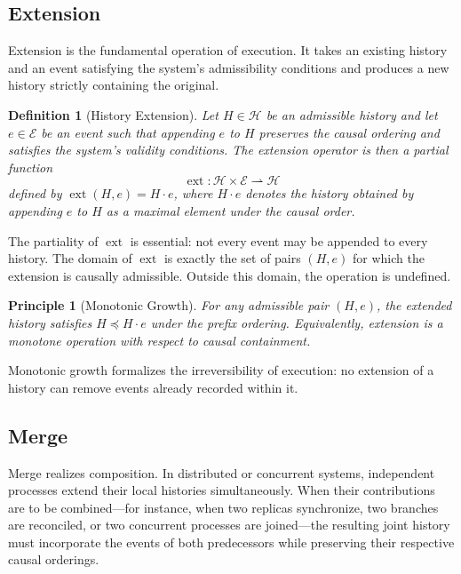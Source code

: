 \documentclass[12pt]{article}
\newtheorem{definition}{Definition}
\newtheorem{principle}{Principle}
\begin{document}
\subsection{Extension}

Extension is the fundamental operation of execution. It takes an existing history and an event satisfying the system's admissibility conditions and produces a new history strictly containing the original.

\begin{definition}[History Extension]
Let $H \in \mathcal{H}$ be an admissible history and let $e \in \mathcal{E}$ be an event such that appending $e$ to $H$ preserves the causal ordering and satisfies the system's validity conditions. The \emph{extension operator} is then a partial function
\[
\operatorname{ext} : \mathcal{H} \times \mathcal{E} \rightharpoonup \mathcal{H}
\]
defined by $\operatorname{ext}(H, e) = H \cdot e$, where $H \cdot e$ denotes the history obtained by appending $e$ to $H$ as a maximal element under the causal order.
\end{definition}

The partiality of $\operatorname{ext}$ is essential: not every event may be appended to every history. The domain of $\operatorname{ext}$ is exactly the set of pairs $(H, e)$ for which the extension is causally admissible. Outside this domain, the operation is undefined.

\begin{principle}[Monotonic Growth]
For any admissible pair $(H, e)$, the extended history satisfies $H \preceq H \cdot e$ under the prefix ordering. Equivalently, extension is a monotone operation with respect to causal containment.
\end{principle}

Monotonic growth formalizes the irreversibility of execution: no extension of a history can remove events already recorded within it.

\subsection{Merge}

Merge realizes composition. In distributed or concurrent systems, independent processes extend their local histories simultaneously. When their contributions are to be combined---for instance, when two replicas synchronize, two branches are reconciled, or two concurrent processes are joined---the resulting joint history must incorporate the events of both predecessors while preserving their respective causal orderings.
\end{document}
